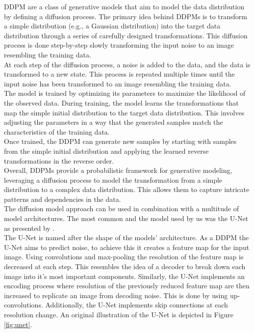 \documentclass[12pt]{article}
\theoremstyle{plain}
\theoremstyle{definition}
\theoremstyle{remark}
\begin{document}
\ac{DDPM} are a class of generative models that aim to model the data distribution by defining a diffusion process. The primary idea behind \ac{DDPM}s is to transform a simple distribution (e.g., a Gaussian distribution) into the target data distribution through a series of carefully designed transformations. This diffusion process is done step-by-step slowly transforming the input noise to an image resembling the training data. \\
At each step of the diffusion process, a noise is added to the data, and the data is transformed to a new state. This process is repeated multiple times until the input noise has been transformed to an image resembling the training data. \\
The model is trained by optimizing its parameters to maximize the likelihood of the observed data. During training, the model learns the transformations that map the simple initial distribution to the target data distribution. This involves adjusting the parameters in a way that the generated samples match the characteristics of the training data.\\
Once trained, the DDPM can generate new samples by starting with samples from the simple initial distribution and applying the learned reverse transformations in the reverse order.\\
Overall, DDPMs provide a probabilistic framework for generative modeling, leveraging a diffusion process to model the transformation from a simple distribution to a complex data distribution. This allows them to capture intricate patterns and dependencies in the data.\\


The diffusion model approach can be used in combination with a multitude of model architectures. The most common and the model used by us was the U-Net as presented by \cite{Ronneberger2015}. \\
The U-Net is named after the shape of the models' architecture. As a \ac{DDPM} the U-Net aims to predict noise, to achieve this it creates a feature map for the input image. Using convolutions and max-pooling the resolution of the feature map is decreased at each step. This resembles the idea of a decoder to break down each image into it's most important components. Similarly, the U-Net implements an encoding process where resolution of the previously reduced feature map are then increased to replicate an image from decoding noise. This is done by using up-convolutions. Additionally, the U-Net implements skip connections at each resolution change. An original illustration of the U-Net is depicted in Figure \ref{fig:unet}.\\
\end{document}
